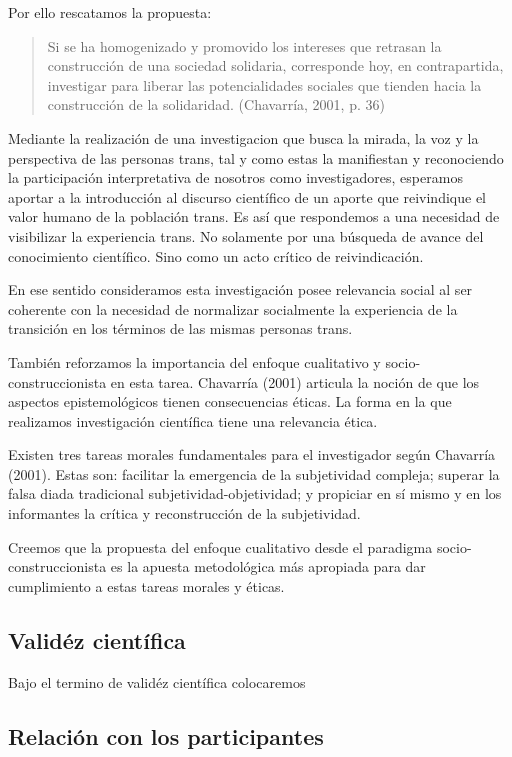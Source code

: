 Por ello rescatamos la propuesta:

\begin{quote}
    Si se ha homogenizado y promovido los intereses que retrasan la construcción de
    una sociedad solidaria, corresponde hoy, en contrapartida, investigar para
    liberar las potencialidades sociales que tienden hacia la construcción de la
    solidaridad. (Chavarría, 2001, p. 36)
\end{quote}

Mediante la realización de una investigacion que busca la mirada,
la voz y la perspectiva de las personas trans, tal y como estas la
manifiestan y reconociendo la participación interpretativa de nosotros como
investigadores, esperamos aportar a la introducción al discurso científico de
un aporte que reivindique el valor humano de la población trans.
Es así que respondemos a una necesidad de visibilizar la experiencia trans.
No solamente por una búsqueda de avance del conocimiento científico.
Sino como un acto crítico de reivindicación.

En ese sentido consideramos esta investigación posee relevancia social al ser
coherente con la necesidad de normalizar socialmente la experiencia de la
transición en los términos de las mismas personas trans.

También reforzamos la importancia del enfoque cualitativo y
socio-construccionista en esta tarea.
Chavarría (2001) articula la noción de que los aspectos epistemológicos
tienen consecuencias éticas.
La forma en la que realizamos investigación científica tiene una relevancia
ética.

Existen tres tareas morales fundamentales para el investigador según
Chavarría (2001).
Estas son: facilitar la emergencia de la subjetividad compleja;
superar la falsa diada tradicional subjetividad-objetividad;
y propiciar en sí mismo y en los informantes la crítica y reconstrucción de
la subjetividad.

Creemos que la propuesta del enfoque cualitativo desde el paradigma
socio-construccionista es la apuesta metodológica más apropiada para dar
cumplimiento a estas tareas morales y éticas.

\subsection{Validéz científica}
Bajo el termino de validéz científica colocaremos

\subsection{Relación con los participantes}
